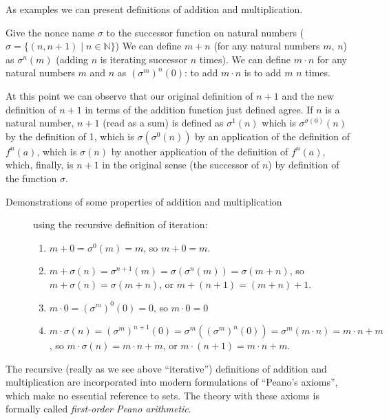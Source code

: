 \documentclass[12pt]{book}
\begin{document}
As examples we can present definitions of addition and multiplication.

Give the nonce name $\sigma$ to the successor function on natural numbers ($\sigma = \{(n,n+1) \mid n \in {\mathbb N}\}$)  We can define
$m+n$ (for any natural numbers $m$, $n$) as $\sigma^n(m)$ (adding $n$
is iterating successor $n$ times).  We can define $m \cdot n$ for any
natural numbers $m$ and $n$ as $(\sigma^m)^n(0)$: to add $m\cdot n$ is
to add $m$ $n$ times.

At this point we can observe that our original definition of $n+1$ and the new definition of $n+1$ in terms of the addition function just defined agree.
If $n$ is a natural number, $n+1$ (read as a sum) is defined as $\sigma^1(n)$ which is $\sigma^{\sigma(0)}(n)$ by the definition of 1, which is $\sigma(\sigma^0(n))$ by an application of the definition of $f^n(a)$, which is $\sigma(n)$ by another application of the definition of $f^n(a)$, which, finally, is $n+1$ in the original sense (the successor of $n$) by definition of the function $\sigma$.

\begin{description}


\item[Demonstrations of some properties of addition and multiplication] using the recursive definition of iteration:
\begin{enumerate}

\item $m+0 = \sigma^0(m) = m$, so $m+0=m$.

\item $m+ \sigma(n) = \sigma^{n+1}(m) = \sigma(\sigma^n(m)) = \sigma(m+n)$, so $m+\sigma(n) = \sigma(m+n)$, or $m+(n+1) = (m+n)+1$.

\item $m \cdot 0 = (\sigma^m)^0(0) = 0$, so $m \cdot 0 = 0$

\item $m \cdot \sigma(n) = (\sigma^m)^{n+1}(0) = \sigma^m((\sigma^m)^n(0)) = \sigma^m(m \cdot n) = m \cdot n + m$, so $m\cdot \sigma(n) = m \cdot n+m$, or $m\cdot(n+1) = m\cdot n + m$.


\end{enumerate}



\end{description}

The recursive (really as we see above ``iterative'') definitions of
addition and multiplication are incorporated into modern formulations
of ``Peano's axioms'', which make no essential reference to sets.  The
theory with these axioms is formally called {\em first-order Peano
arithmetic\/}.
\end{document}
